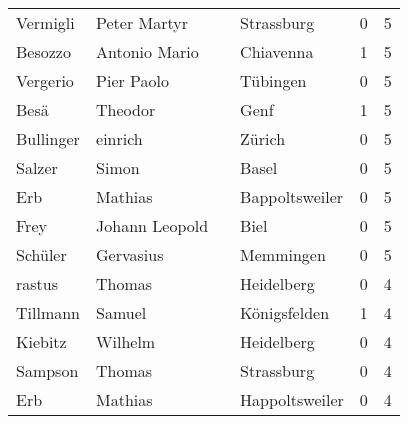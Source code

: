 \begin{center}
\begin{tiny}
\begin{longtabu}{llllrr}
                 Vermigli &                       Peter Martyr &             &                                  Strassburg &          0 &         5 \\
                  Besozzo &                      Antonio Mario &             &                                   Chiavenna &          1 &         5 \\
                 Vergerio &                         Pier Paolo &             &                                    Tübingen &          0 &         5 \\
                     Besä &                            Theodor &             &                                        Genf &          1 &         5 \\
                Bullinger &                            einrich &             &                                      Zürich &          0 &         5 \\
                   Salzer &                              Simon &             &                                       Basel &          0 &         5 \\
                      Erb &                            Mathias &             &                              Bappoltsweiler &          0 &         5 \\
                     Frey &                     Johann Leopold &             &                                        Biel &          0 &         5 \\
                  Schüler &                          Gervasius &             &                                   Memmingen &          0 &         5 \\
                   rastus &                             Thomas &             &                                  Heidelberg &          0 &         4 \\
                 Tillmann &                             Samuel &             &                                Königsfelden &          1 &         4 \\
                  Kiebitz &                            Wilhelm &             &                                  Heidelberg &          0 &         4 \\
                  Sampson &                             Thomas &             &                                  Strassburg &          0 &         4 \\
                      Erb &                            Mathias &             &                              Happoltsweiler &          0 &         4 \\

\end{longtabu}
\end{tiny}
\end{center}
